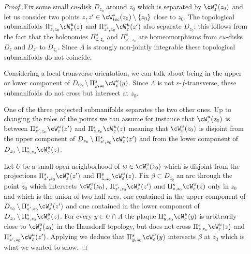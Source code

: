 \documentclass[a4paper,11pt]{amsart}
\numberwithin{equation}{section}     %
\theoremstyle{definition}
\theoremstyle{remark}
\newcommand{\eps}{\varepsilon}
\begin{document}
\begin{proof}
Fix some small $cu$-disk $D_{z_0}$ around $z_0$ which is separated by $\cW^u_{\eps}(z_0)$ and let us consider two points $z,z' \in \cW^s_{loc}(z_0)\setminus \{z_0\}$ close to $z_0$. The topological submanifolds $\Pi^s_{z,z_0}\cW^u_\varepsilon(z)$ and $\Pi^s_{z',z_0}\cW^u_\varepsilon(z')$ also separate $D_{z_0}$: this follows from the fact that the holonomies $\Pi^s_{z,z_0}$ and $\Pi^s_{z',z_0}$ are homeomorphisms from $cu$-disks $D_z$ and $D_{z'}$ to $D_{z_0}$.
Since $\Lambda$ is strongly non-jointly integrable these topological submanifolds do not coincide.

Considering a local transverse orientation, we can talk about being in the upper or lower component of $D_{z_0} \setminus \Pi^s_{y,z_0} \cW^{u}_{\eps}(y)$. Since $\Lambda$ is not $\varepsilon$-$f$-transverse, these submanifolds do not cross but intersect at $z_0$.

One of the three projected submanifolds separates the two other ones. Up to changing the roles of the points we can assume for instance that $\cW^{u}_{\eps}(z_0)$ is between $\Pi^s_{z',z_0}\cW^u_{\eps}(z')$ and $\Pi^s_{z,z_0}\cW^u_{\eps}(z)$ meaning that $\cW^u_{\eps}(z_0)$ is disjoint from the upper component of $D_{z_0} \setminus \Pi^s_{z',z_0} \cW^u_{\eps}(z')$ and from the lower component of $D_{z_0} \setminus \Pi^s_{z,z_0} \cW^u_{\eps}(z)$. 

Let $U$ be a small open neighborhood of $w \in \cW^u_\eps(z_0)$ which is disjoint from the projections $\Pi^s_{z',z_0}\cW^u_{\eps}(z')$ and $\Pi^s_{z,z_0}\cW^u_{\eps}(z)$. Fix $\beta \subset D_{z_0}$ an arc
through the point $z_0$ which intersects $\cW^u_{\eps}(z_0)$,  $\Pi^s_{z',z_0}\cW^u_{\eps}(z')$ and $\Pi^s_{z,z_0}\cW^u_{\eps}(z)$ only in $z_0$ and which is the union of two half arcs, one contained in the upper component of $D_{z_0} \setminus \Pi^s_{z',z_0} \cW^u_{\eps}(z')$ and one contained in  the lower component of $D_{z_0} \setminus \Pi^s_{z,z_0} \cW^u_{\eps}(z)$. For every $y\in U\cap \Lambda$ the plaque $\Pi^s_{y,z_0}\cW^u_{\eps}(y)$ is arbitrarily close to $\cW^u_{\eps}(z_0)$ in the Hausdorff topology, but does not cross $\Pi^s_{z,z_0}\cW^u_{\eps}(z)$ and $\Pi^s_{z',z_0}\cW^u_{\eps}(z')$. Applying \cite[Lemma 7.1]{CPoS} we deduce that $\Pi^s_{y,z_0} \cW^u_{\eps}(y)$ intersects $\beta$ at $z_0$ which is what we wanted to show. 
\end{proof}
\end{document}
